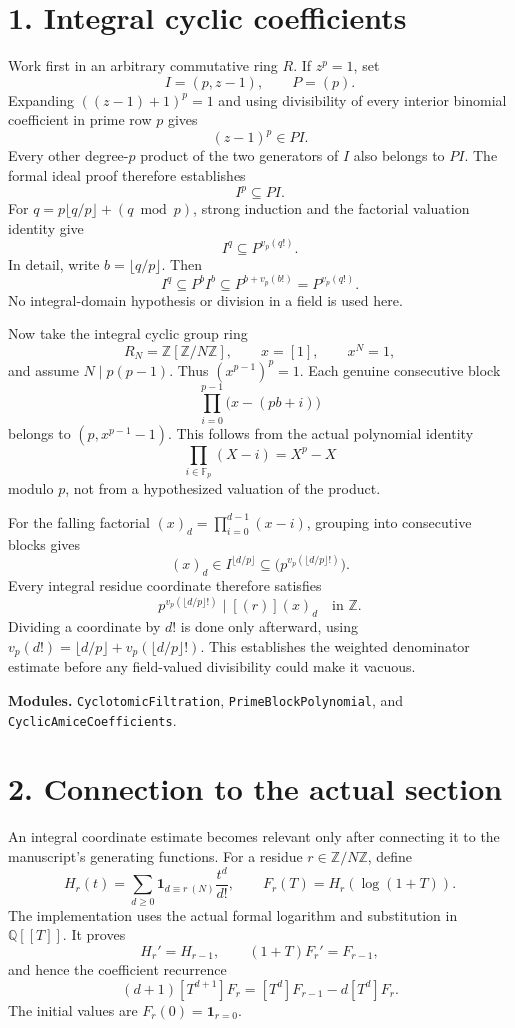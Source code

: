 \documentclass[11pt]{article}
\newcommand{\Z}{\mathbb Z}\newcommand{\Q}{\mathbb Q}\newcommand{\N}{\mathbb N}\newcommand{\F}{\mathbb F}
\newcommand{\coef}[2]{[#1^{#2}]}
\begin{document}
\section*{1. Integral cyclic coefficients}
Work first in an arbitrary commutative ring $R$. If $z^p=1$, set
\[
 I=(p,z-1),\qquad P=(p).
\]
Expanding $((z-1)+1)^p=1$ and using divisibility of every interior binomial coefficient in prime row $p$ gives
\[
 (z-1)^p\in PI.
\]
Every other degree-$p$ product of the two generators of $I$ also belongs to $PI$. The formal ideal proof therefore establishes
\[
 \boxed{I^p\subseteq PI.}
\]
For $q=p\lfloor q/p\rfloor+(q\bmod p)$, strong induction and the factorial valuation identity give
\[
 \boxed{I^q\subseteq P^{v_p(q!)}}.
\]
In detail, write $b=\lfloor q/p\rfloor$. Then
\[
 I^q\subseteq P^b I^b\subseteq P^{b+v_p(b!)}=P^{v_p(q!)}.
\]
No integral-domain hypothesis or division in a field is used here.

Now take the integral cyclic group ring
\[
 R_N=\Z[\Z/N\Z],\qquad x=[1],\qquad x^N=1,
\]
and assume $N\mid p(p-1)$. Thus $(x^{p-1})^p=1$. Each genuine consecutive block
\[
 \prod_{i=0}^{p-1}\bigl(x-(pb+i)\bigr)
\]
belongs to $(p,x^{p-1}-1)$. This follows from the actual polynomial identity
\[
 \prod_{i\in\F_p}(X-i)=X^p-X
\]
modulo $p$, not from a hypothesized valuation of the product.

For the falling factorial $(x)_d=\prod_{i=0}^{d-1}(x-i)$, grouping into consecutive blocks gives
\[
 (x)_d\in I^{\lfloor d/p\rfloor}
 \subseteq\bigl(p^{v_p(\lfloor d/p\rfloor!)}\bigr).
\]
Every integral residue coordinate therefore satisfies
\[
 \boxed{p^{v_p(\lfloor d/p\rfloor!)}\mid [(r)](x)_d\quad\text{in }\Z.}
\]
Dividing a coordinate by $d!$ is done only afterward, using
$v_p(d!)=\lfloor d/p\rfloor+v_p(\lfloor d/p\rfloor!)$. This establishes the weighted denominator estimate before any field-valued divisibility could make it vacuous.

\textbf{Modules.} \texttt{CyclotomicFiltration}, \texttt{PrimeBlockPolynomial}, and \texttt{CyclicAmiceCoefficients}.
\newpage
\section*{2. Connection to the actual section}
An integral coordinate estimate becomes relevant only after connecting it to the manuscript's generating functions. For a residue $r\in\Z/N\Z$, define
\[
 H_r(t)=\sum_{d\ge0}\mathbf1_{d\equiv r\ (N)}\frac{t^d}{d!},
 \qquad F_r(T)=H_r(\log(1+T)).
\]
The implementation uses the actual formal logarithm and substitution in $\Q[[T]]$. It proves
\[
 H_r'=H_{r-1},\qquad (1+T)F_r'=F_{r-1},
\]
and hence the coefficient recurrence
\[
 (d+1)\coef{T}{d+1}F_r
 =\coef{T}{d}F_{r-1}-d\coef{T}{d}F_r.
\]
The initial values are $F_r(0)=\mathbf1_{r=0}$.
\end{document}
